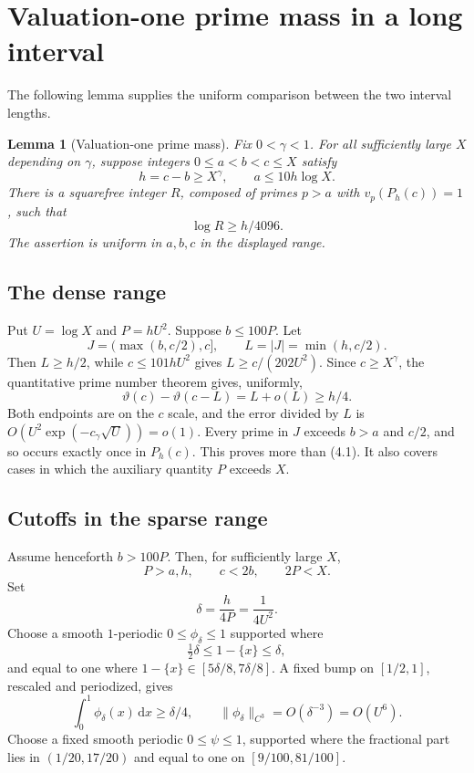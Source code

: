 \documentclass[letterpaper]{article}
\newtheorem{lemma}[theorem]{Lemma}
\theoremstyle{definition}
\theoremstyle{remark}
\numberwithin{equation}{section}
\begin{document}
\section{Valuation-one prime mass in a long interval}

The following lemma supplies the uniform comparison between the two interval lengths.

\begin{lemma}[Valuation-one prime mass]
Fix $0<\gamma<1$. For all sufficiently large $X$ depending
on $\gamma$, suppose integers $0\le a<b<c\le X$ satisfy
\[
  h=c-b\ge X^\gamma,\qquad a\le 10h\log X.
\]
There is a squarefree integer $R$, composed of primes $p>a$ with $v_p(P_h(c))=1$, such that
\begin{equation}
  \log R\ge h/4096.
\end{equation}
The assertion is uniform in $a,b,c$ in the displayed range.
\end{lemma}

\subsection{The dense range}

Put $U=\log X$ and $P=hU^2$. Suppose $b\le 100P$. Let
\[
  J=(\max(b,c/2),c],\qquad L=|J|=\min(h,c/2).
\]
Then $L\ge h/2$, while $c\le 101hU^2$ gives $L\ge c/(202U^2)$. Since $c\ge X^\gamma$, the quantitative prime
number theorem gives, uniformly,
\[
  \vartheta(c)-\vartheta(c-L)=L+o(L)\ge h/4.
\]
Both endpoints are on the $c$ scale, and the error divided by $L$ is $O(U^2\exp(-c_\gamma\sqrt U))=o(1)$.
Every prime in $J$ exceeds $b>a$ and $c/2$, and so occurs exactly once in $P_h(c)$. This proves more
than (4.1). It also covers cases in which the auxiliary quantity $P$ exceeds $X$.

\subsection{Cutoffs in the sparse range}

Assume henceforth $b>100P$. Then, for sufficiently large $X$,
\[
  P>a,h,\qquad c<2b,\qquad 2P<X.
\]
Set
\[
  \delta=\frac{h}{4P}=\frac{1}{4U^2}.
\]
Choose a smooth $1$-periodic $0\le\phi_\delta\le 1$ supported where
\[
  \tfrac12\delta\le 1-\{x\}\le\delta,
\]
and equal to one where $1-\{x\}\in[5\delta/8,7\delta/8]$. A fixed bump on $[1/2,1]$, rescaled and periodized,
gives
\begin{equation}
  \int_0^1\phi_\delta(x)\,\mathrm dx\ge\delta/4,\qquad \|\phi_\delta\|_{C^3}=O(\delta^{-3})=O(U^6).
\end{equation}
Choose a fixed smooth periodic $0\le\psi\le 1$, supported where the fractional part lies in
$(1/20,17/20)$ and equal to one on $[9/100,81/100]$.
\end{document}
